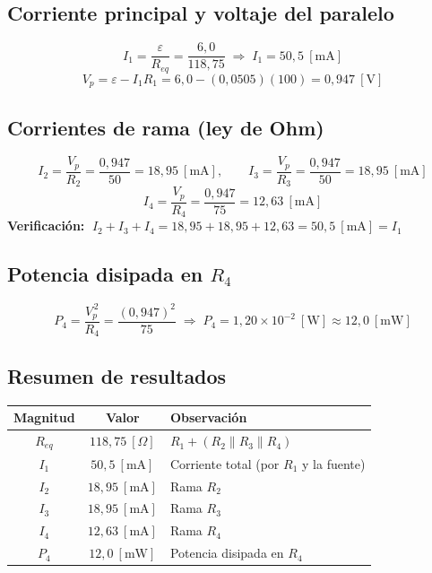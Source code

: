 \documentclass[12pt,letterpaper]{article}
\begin{document}
\subsection*{Corriente principal y voltaje del paralelo}
\[
    I_1 = \frac{\varepsilon}{R_{eq}} = \frac{6{,}0}{118{,}75} \;\Rightarrow\;
    \boxed{I_1 = 50{,}5\ [\text{mA}]}
\]
\[
    V_p = \varepsilon - I_1 R_1 = 6{,}0 - (0{,}0505)(100) = 0{,}947\ [\text{V}]
\]

\subsection*{Corrientes de rama (ley de Ohm)}
\[
    I_2 = \frac{V_p}{R_2} = \frac{0{,}947}{50} = 18{,}95\ [\text{mA}],
    \qquad
    I_3 = \frac{V_p}{R_3} = \frac{0{,}947}{50} = 18{,}95\ [\text{mA}]
\]
\[
    I_4 = \frac{V_p}{R_4} = \frac{0{,}947}{75} = 12{,}63\ [\text{mA}]
\]
\noindent\textbf{Verificaci\'on:} $\;I_2 + I_3 + I_4 = 18{,}95 + 18{,}95 + 12{,}63 = 50{,}5\ [\text{mA}] = I_1$ \checkmark

\subsection*{Potencia disipada en $R_4$}
\[
    P_4 = \frac{V_p^{\,2}}{R_4} = \frac{(0{,}947)^2}{75}
    \;\Rightarrow\; \boxed{P_4 = 1{,}20\times10^{-2}\ [\text{W}] \approx 12{,}0\ [\text{mW}]}
\]

\subsection*{Resumen de resultados}
\begin{center}
\begin{tabular}{|c|c|l|}
\hline
\textbf{Magnitud} & \textbf{Valor} & \textbf{Observaci\'on} \\
\hline
$R_{eq}$ & $118{,}75\ [\Omega]$ & $R_1 + (R_2\parallel R_3\parallel R_4)$ \\
$I_1$ & $50{,}5\ [\text{mA}]$ & Corriente total (por $R_1$ y la fuente) \\
$I_2$ & $18{,}95\ [\text{mA}]$ & Rama $R_2$ \\
$I_3$ & $18{,}95\ [\text{mA}]$ & Rama $R_3$ \\
$I_4$ & $12{,}63\ [\text{mA}]$ & Rama $R_4$ \\
$P_4$ & $12{,}0\ [\text{mW}]$ & Potencia disipada en $R_4$ \\
\hline
\end{tabular}
\end{center}
\end{document}
